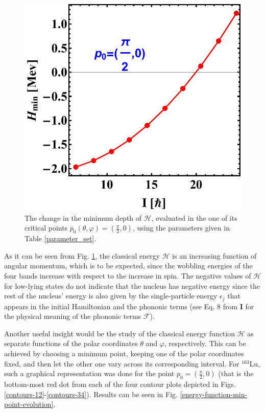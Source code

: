 \documentclass[myclassdoc,debug]{rjparticle}
\begin{document}
\begin{figure}
    \centering
    \includegraphics[scale=0.5]{figs/energyFunction_minPoint_Evolution.pdf}
    \caption{The change in the minimum depth of $\mathcal{H}$, evaluated in the one of its critical points $p_0(\theta,\varphi)=(\frac{\pi}{2},0)$, using the parameters given in Table \ref{parameter_set}.}
    \label{energy-function-minimum-evolution}
\end{figure}

As it can be seen from Fig. \ref{energy-function-minimum-evolution}, the classical energy $\mathcal{H}$ is an increasing function of angular momentum, which is to be expected, since the wobbling energies of the four bands increase with respect to the increase in spin. The negative values of $\mathcal{H}$ for low-lying states do not indicate that the nucleus has negative energy since the rest of the nucleus' energy is also given by the single-particle energy $\epsilon_j$ that appears in the initial Hamiltonian and the phononic terms (see Eq. 8 from \textbf{I} for the physical meaning of the phononic terms $\mathcal{F}$).

Another useful insight would be the study of the classical energy function $\mathcal{H}$ as separate functions of the polar coordinates $\theta$ and $\varphi$, respectively. This can be achieved by choosing a minimum point, keeping one of the polar coordinates fixed, and then let the other one vary across its corresponding interval. For $^{163}$Lu, such a graphical representation was done for the point $p_0=\left(\frac{\pi}{2},0\right)$ (that is the bottom-most red dot from each of the four contour plots depicted in Figs. \ref{contours-12}-\ref{contours-34}). Results can be seen in Fig. \ref{energy-function-min-point-evolution}.
\end{document}
